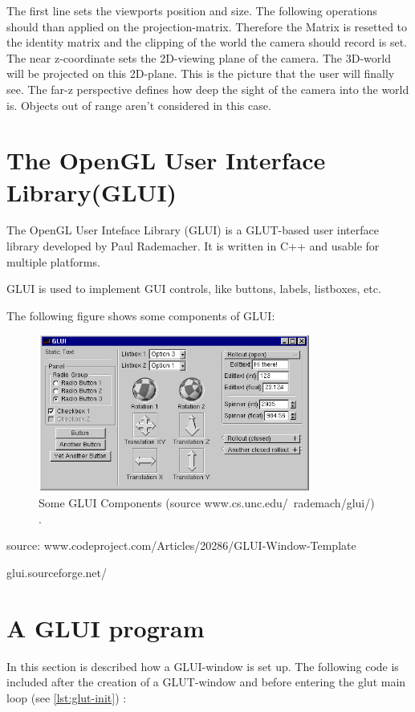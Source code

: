 \documentclass[10pt,a4paper,DIV=11]{scrreprt}
\begin{document}
The first line sets the viewports position and size. The following operations should than applied on the projection-matrix. Therefore the Matrix is resetted to the identity matrix and the clipping of the world the camera should record is set. The near z-coordinate sets the 2D-viewing plane of the camera. The 3D-world will be projected on this 2D-plane. This is the picture that the user will finally see. The far-z perspective defines how deep the sight of the camera into the world is. Objects out of range aren't considered in this case. \\

\section{The OpenGL User Interface Library(GLUI)}
The OpenGL User Inteface Library (GLUI) is a GLUT-based user interface library developed by Paul Rademacher. It is written in C++ and usable for multiple platforms.

GLUI is used to implement GUI controls, like buttons, labels, listboxes, etc.

The following figure shows some components of GLUI:

\begin{center}
	\begin{figure}[H]
		\centering
		\includegraphics[width=0.8\textwidth,scale=1.0]{files/glui.png}  
		\caption{Some GLUI Components (source www.cs.unc.edu/~rademach/glui/) \cite{ogl-glui}.}
		\label{fig:ogl-glui}
	\end{figure}
\end{center}

source: www.codeproject.com/Articles/20286/GLUI-Window-Template

glui.sourceforge.net/

\newpage

\section{A GLUI program}
In this section is described how a GLUI-window is set up.
The following code is included after the creation of a GLUT-window and before entering the glut main loop (see \ref{lst:glut-init}) :
\end{document}
